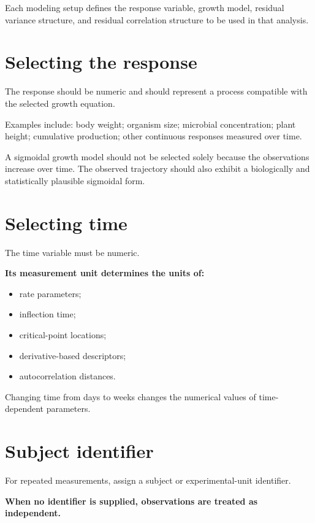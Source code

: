 \documentclass[
  english,
  letterpaper,
  DIV=11,
  numbers=noendperiod]{scrreprt}
\begin{document}
Each modeling setup defines the response variable, growth model,
residual variance structure, and residual correlation structure to be
used in that analysis.

\section{Selecting the response}\label{selecting-the-response}

The response should be numeric and should represent a process compatible
with the selected growth equation.

Examples include: body weight; organism size; microbial concentration;
plant height; cumulative production; other continuous responses measured
over time.

A sigmoidal growth model should not be selected solely because the
observations increase over time. The observed trajectory should also
exhibit a biologically and statistically plausible sigmoidal form.

\section{Selecting time}\label{selecting-time}

The time variable must be numeric.

\textbf{Its measurement unit determines the units of:}

\begin{itemize}
\item
  rate parameters;
\item
  inflection time;
\item
  critical-point locations;
\item
  derivative-based descriptors;
\item
  autocorrelation distances.
\end{itemize}

Changing time from days to weeks changes the numerical values of
time-dependent parameters.

\section{Subject identifier}\label{subject-identifier-1}

For repeated measurements, assign a subject or experimental-unit
identifier.

\textbf{When no identifier is supplied, observations are treated as
independent.}
\end{document}
